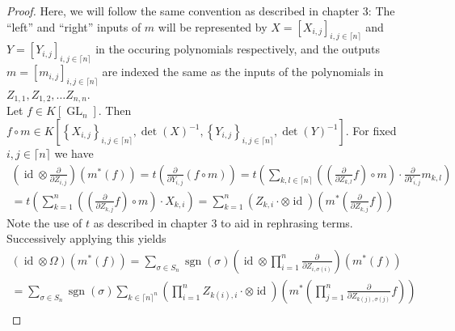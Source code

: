 \begin{proof}
  Here, we will follow the same convention as described in chapter 3: The ``left'' and ``right'' inputs of $ m $ will be represented by $ X = \left\lbrack X_{i,j} \right\rbrack_{i,j \in \lceil n \rceil} $ and $ Y = \left\lbrack Y_{i,j} \right\rbrack_{i,j \in \lceil n \rceil} $ in the occuring polynomials respectively, and the outputs $ m = \left\lbrack m_{i,j} \right\rbrack_{i,j \in \lceil n \rceil} $ are indexed the same as the inputs of the polynomials in $ Z_{1,1} , Z_{1,2} , \ldots Z_{n,n} $.\\
  Let $f \in K \left\lbrack \operatorname{GL}_n \right\rbrack $.
  Then $ f \circ m \in K \left\lbrack \left\{ X_{i,j} \right\}_{i,j \in \lceil n \rceil} , \operatorname{det} \left( X \right)^{-1} , \left\{ Y_{i,j} \right\}_{i,j \in \lceil n \rceil} , \operatorname{det} \left( Y \right)^{-1} \right\rbrack $.
  For fixed $i,j \in \lceil n \rceil $ we have
  \begin{equation}
    \begin{aligned}
    \left( \operatorname{id} \otimes \frac{\partial}{\partial Z_{i,j}} \right) \left( m^\ast \left( f \right) \right) 
    = t \left( \frac{\partial}{\partial Y_{i,j}} \left( f \circ m \right) \right) 
    = t \left( \sum_{k,l \in \lceil n \rceil} \left( \left( \frac{\partial}{\partial Z_{k,l}} f \right) \circ m \right) \cdot \frac{\partial}{\partial Y_{i,j}} m_{k,l} \right) \\
    = t \left( \sum_{k = 1}^n \left( \left( \frac{\partial}{\partial Z_{k,j}} f \right) \circ m \right) \cdot X_{k,i} \right) 
    = \sum_{k=1}^n \left( Z_{k,i} \cdot \otimes \operatorname{id} \right) \left( m^\ast \left( \frac{\partial}{\partial Z_{k,j}} f \right) \right)
    \end{aligned}
  \end{equation}
  Note the use of $ t $ as described in chapter 3 to aid in rephrasing terms.
  Successively applying this yields
  \begin{equation}
    \begin{aligned}
      \left( \operatorname{id} \otimes \Omega \right) \left( m^\ast \left( f \right) \right)
      = \sum_{\sigma \in S_n} \operatorname{sgn} \left( \sigma \right) \left( \operatorname{id} \otimes \prod_{i=1}^n \frac{\partial}{\partial Z_{i,\sigma \left( i \right)}} \right) \left( m^\ast \left( f \right) \right) \\
      = \sum_{\sigma \in S_n} \operatorname{sgn} \left( \sigma \right) \sum_{k \in \lceil n \rceil^n} \left( \prod_{i=1}^n Z_{k(i),i} \cdot \otimes \operatorname{id} \right) \left( m^\ast \left( \prod_{j=1}^n \frac{\partial}{\partial Z_{k(j),\sigma (j)}} f \right) \right) \\

\end{aligned}
\end{equation}
\end{proof}
